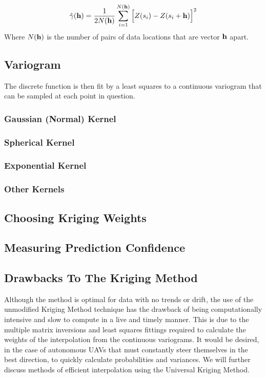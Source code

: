 \documentclass[11pt]{ucthesis}
\begin{document}
\begin{equation}
\hat{\gamma}({\bf{h}})=\dfrac{1}{2N({\bf{h}})}\sum_{i=1}^{N({\bf{h}})}\Big[Z(s_{i})-Z(s_{i}+{\bf{h}})\Big]^{2}
\end{equation}
Where $N({\bf{h}})$ is the number of pairs of data locations that are vector ${\bf{h}}$ apart.

\subsection{Variogram}
The discrete function is then fit by a least squares to a continuous variogram that can be sampled at each point in question.

\subsubsection{Gaussian (Normal) Kernel}
\subsubsection{Spherical Kernel}
\subsubsection{Exponential Kernel}
\subsubsection{Other Kernels}

\subsection{Choosing Kriging Weights}

\subsection{Measuring Prediction Confidence}

\subsection{Drawbacks To The Kriging Method}
Although the method is optimal for data with no trends or drift, the use of the unmodified Kriging Method technique has the drawback of being computationally intensive and slow to compute in a live and timely manner. This is due to the multiple matrix inversions and least squares fittings required to calculate the weights of the interpolation from the continuous variograms. It would be desired, in the case of autonomous UAVs that must constantly steer themselves in the best direction, to quickly calculate probabilities and variances. We will further discuss methods of efficient interpolation using the Universal Kriging Method.
\end{document}
